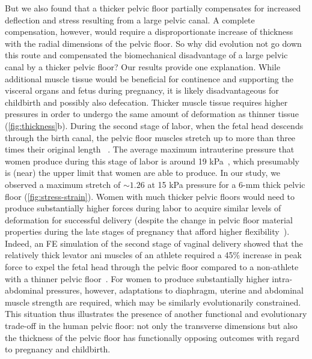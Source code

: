 \documentclass[9pt,twocolumn,twoside]{pnas-new}
\begin{document}
But we also found that a thicker pelvic floor partially compensates for increased deflection and stress resulting from a large pelvic canal. A complete compensation, however, would require a disproportionate increase of thickness with the radial dimensions of the pelvic floor. So why did evolution not go down this route and compensated the biomechanical disadvantage of a large pelvic canal by a thicker pelvic floor? Our results provide one explanation. While additional muscle tissue would be beneficial for continence and supporting the visceral organs and fetus during pregnancy, it is likely disadvantageous for childbirth and possibly also defecation. Thicker muscle tissue requires higher pressures in order to undergo the same amount of deformation as thinner tissue (\cref{fig:thickness}b). During the second stage of labor, when the fetal head descends through the birth canal, the pelvic floor muscles stretch up to more than three times their original length~
\cite{Kuthe2016-rx,Lien2004-gj}. The average maximum intrauterine pressure that women produce during this stage of labor is around 19 kPa~\cite{Li2008-zh}, which presumably is (near) the upper limit that women are able to produce. In our study, we observed a maximum stretch of $\sim 1.26$ at 15 kPa pressure for a 6-mm thick pelvic floor (\cref{fig:stress-strain}). Women with much thicker pelvic floors would need to produce substantially higher forces during labor to acquire similar levels of deformation for successful delivery (despite the change in pelvic floor material properties during the late stages of pregnancy that afford higher flexibility~\cite{Rempen1991-ru}). Indeed, an FE simulation of the second stage of vaginal delivery showed that the relatively thick levator ani muscles of an athlete required a 45\% increase in peak force to expel the fetal head through the pelvic floor compared to a non-athlete with a thinner pelvic floor~\cite{Lien2004-gj}. For women to produce substantially higher intra-abdominal pressures, however, adaptations to diaphragm, uterine and abdominal muscle strength are required, which may be similarly evolutionarily constrained. This situation thus illustrates the presence of another functional and evolutionary trade-off in the human pelvic floor: not only the transverse dimensions but also the thickness of the pelvic floor has functionally opposing outcomes with regard to pregnancy and childbirth. 
\end{document}
